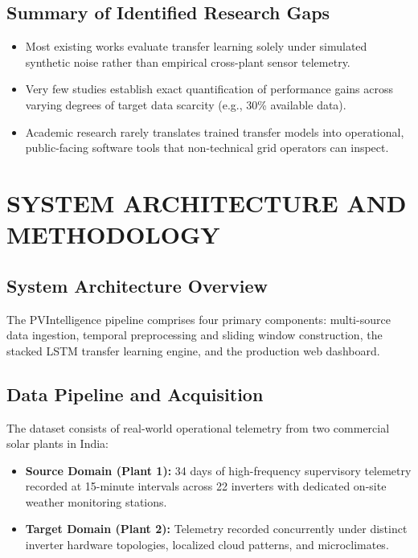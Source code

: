 \documentclass[12pt,a4paper,oneside]{report}
\begin{document}
\section{Summary of Identified Research Gaps}
\begin{itemize}
    \item Most existing works evaluate transfer learning solely under simulated synthetic noise rather than empirical cross-plant sensor telemetry.
    \item Very few studies establish exact quantification of performance gains across varying degrees of target data scarcity (e.g., 30\% available data).
    \item Academic research rarely translates trained transfer models into operational, public-facing software tools that non-technical grid operators can inspect.
\end{itemize}

\newpage
\chapter{SYSTEM ARCHITECTURE AND METHODOLOGY}

\section{System Architecture Overview}
The PVIntelligence pipeline comprises four primary components: multi-source data ingestion, temporal preprocessing and sliding window construction, the stacked LSTM transfer learning engine, and the production web dashboard.

\section{Data Pipeline and Acquisition}
The dataset consists of real-world operational telemetry from two commercial solar plants in India:
\begin{itemize}
    \item \textbf{Source Domain (Plant 1):} 34 days of high-frequency supervisory telemetry recorded at 15-minute intervals across 22 inverters with dedicated on-site weather monitoring stations.
    \item \textbf{Target Domain (Plant 2):} Telemetry recorded concurrently under distinct inverter hardware topologies, localized cloud patterns, and microclimates.
\end{itemize}
\end{document}
